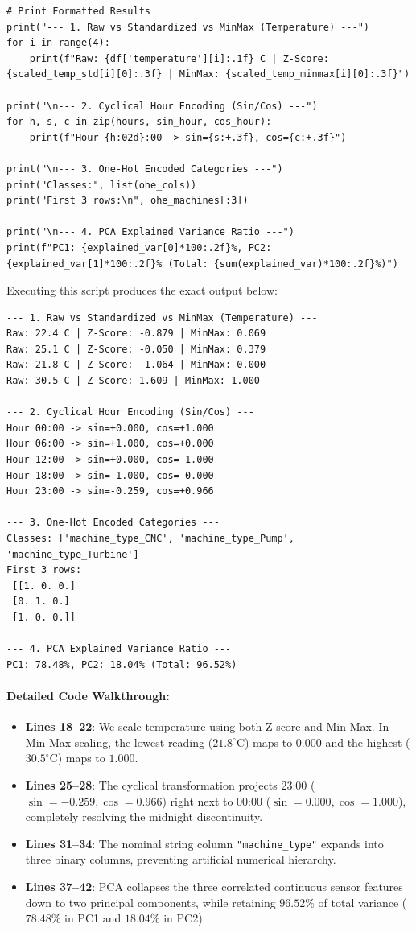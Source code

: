 \begin{lstlisting}[style=pythonstyle]
# Print Formatted Results
print("--- 1. Raw vs Standardized vs MinMax (Temperature) ---")
for i in range(4):
    print(f"Raw: {df['temperature'][i]:.1f} C | Z-Score: {scaled_temp_std[i][0]:.3f} | MinMax: {scaled_temp_minmax[i][0]:.3f}")

print("\n--- 2. Cyclical Hour Encoding (Sin/Cos) ---")
for h, s, c in zip(hours, sin_hour, cos_hour):
    print(f"Hour {h:02d}:00 -> sin={s:+.3f}, cos={c:+.3f}")

print("\n--- 3. One-Hot Encoded Categories ---")
print("Classes:", list(ohe_cols))
print("First 3 rows:\n", ohe_machines[:3])

print("\n--- 4. PCA Explained Variance Ratio ---")
print(f"PC1: {explained_var[0]*100:.2f}%, PC2: {explained_var[1]*100:.2f}% (Total: {sum(explained_var)*100:.2f}%)")
\end{lstlisting}

Executing this script produces the exact output below:
\begin{lstlisting}[style=outputstyle]
--- 1. Raw vs Standardized vs MinMax (Temperature) ---
Raw: 22.4 C | Z-Score: -0.879 | MinMax: 0.069
Raw: 25.1 C | Z-Score: -0.050 | MinMax: 0.379
Raw: 21.8 C | Z-Score: -1.064 | MinMax: 0.000
Raw: 30.5 C | Z-Score: 1.609 | MinMax: 1.000

--- 2. Cyclical Hour Encoding (Sin/Cos) ---
Hour 00:00 -> sin=+0.000, cos=+1.000
Hour 06:00 -> sin=+1.000, cos=+0.000
Hour 12:00 -> sin=+0.000, cos=-1.000
Hour 18:00 -> sin=-1.000, cos=-0.000
Hour 23:00 -> sin=-0.259, cos=+0.966

--- 3. One-Hot Encoded Categories ---
Classes: ['machine_type_CNC', 'machine_type_Pump', 'machine_type_Turbine']
First 3 rows:
 [[1. 0. 0.]
 [0. 1. 0.]
 [1. 0. 0.]]

--- 4. PCA Explained Variance Ratio ---
PC1: 78.48%, PC2: 18.04% (Total: 96.52%)
\end{lstlisting}

\paragraph{Detailed Code Walkthrough:}
\begin{itemize}
    \item \textbf{Lines 18--22}: We scale temperature using both Z-score and Min-Max. In Min-Max scaling, the lowest reading ($21.8^\circ\text{C}$) maps to $0.000$ and the highest ($30.5^\circ\text{C}$) maps to $1.000$.
    \item \textbf{Lines 25--28}: The cyclical transformation projects 23:00 ($\sin = -0.259, \cos = 0.966$) right next to 00:00 ($\sin = 0.000, \cos = 1.000$), completely resolving the midnight discontinuity.
    \item \textbf{Lines 31--34}: The nominal string column \texttt{"machine\_type"} expands into three binary columns, preventing artificial numerical hierarchy.
    \item \textbf{Lines 37--42}: PCA collapses the three correlated continuous sensor features down to two principal components, while retaining $96.52\%$ of total variance ($78.48\%$ in PC1 and $18.04\%$ in PC2).
\end{itemize}

